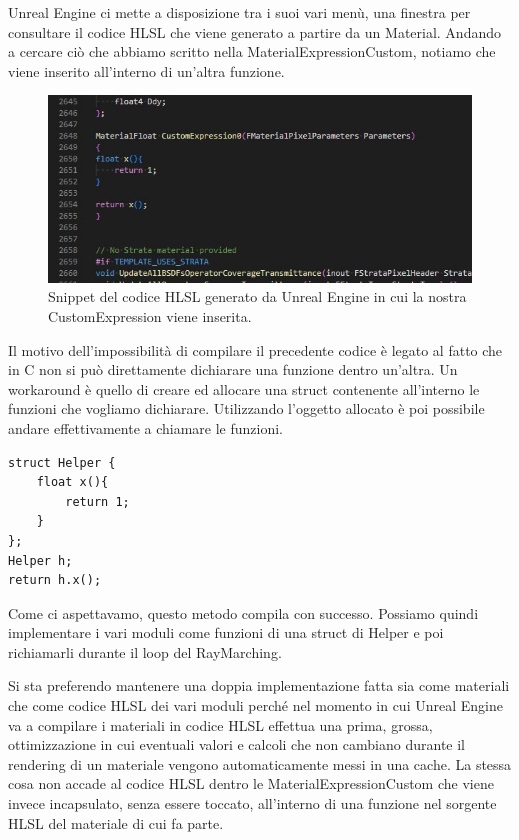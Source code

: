 \documentclass[main.tex]{subfiles}
\begin{document}
\noindent Unreal Engine ci mette a disposizione tra i suoi vari menù, una finestra per consultare il codice HLSL che viene generato a partire da un Material. Andando a cercare ciò che abbiamo scritto nella MaterialExpressionCustom, notiamo che viene inserito all'interno di un'altra funzione.
\begin{figure}[H] %
    \centering
    \includegraphics[width=0.8\linewidth]{img/renderingPipeline/hlslFunInUn.jpg}
    \caption{Snippet del codice HLSL generato da Unreal Engine in cui la nostra CustomExpression viene inserita.}
    \label{fig:2_funcInFunc}
\end{figure}

\noindent Il motivo dell'impossibilità di compilare il precedente codice è legato al fatto che in C non si può direttamente dichiarare una funzione dentro un'altra. Un workaround è quello di creare ed allocare una struct contenente all'interno le funzioni che vogliamo dichiarare. Utilizzando l'oggetto allocato è poi possibile andare effettivamente a chiamare le funzioni.
\begin{lstlisting}
struct Helper {
    float x(){
        return 1;
    }
};
Helper h;
return h.x();
\end{lstlisting}
Come ci aspettavamo, questo metodo compila con successo. Possiamo quindi implementare i vari moduli come funzioni di una struct di Helper e poi richiamarli durante il loop del RayMarching. \newline

Si sta preferendo mantenere una doppia implementazione fatta sia come materiali che come codice HLSL dei vari moduli perché nel momento in cui Unreal Engine va a compilare i materiali in codice HLSL effettua una prima, grossa, ottimizzazione in cui eventuali valori e calcoli che non cambiano durante il rendering di un materiale vengono automaticamente messi in una cache. La stessa cosa non accade al codice HLSL dentro le MaterialExpressionCustom che viene invece incapsulato, senza essere toccato, all'interno di una funzione nel sorgente HLSL del materiale di cui fa parte. \cite{hlslNoOptimize}
\end{document}
